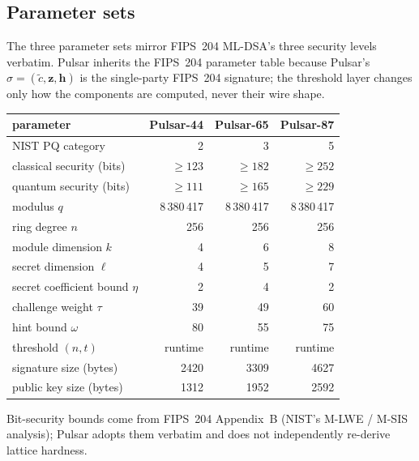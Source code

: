 
\subsection*{Parameter sets}

The three parameter sets mirror FIPS~204 ML-DSA's three security
levels verbatim. Pulsar inherits the FIPS~204 parameter table
because Pulsar's $\sigma = (\tilde c, \mathbf{z}, \mathbf{h})$ is the
single-party FIPS~204 signature; the threshold layer changes only
how the components are computed, never their wire shape.

\begin{center}
\begin{tabular}{l r r r}
\toprule
parameter & Pulsar-44 & Pulsar-65 & Pulsar-87 \\
\midrule
NIST PQ category               & 2          & 3          & 5 \\
classical security (bits)      & $\geq 123$ & $\geq 182$ & $\geq 252$ \\
quantum security (bits)        & $\geq 111$ & $\geq 165$ & $\geq 229$ \\
modulus $q$                    & 8\,380\,417 & 8\,380\,417 & 8\,380\,417 \\
ring degree $n$                & 256        & 256        & 256 \\
module dimension $k$           & 4          & 6          & 8 \\
secret dimension $\ell$        & 4          & 5          & 7 \\
secret coefficient bound $\eta$& 2          & 4          & 2 \\
challenge weight $\tau$        & 39         & 49         & 60 \\
hint bound $\omega$            & 80         & 55         & 75 \\
threshold $(n, t)$             & runtime    & runtime    & runtime \\
\midrule
signature size (bytes)         & 2420       & 3309       & 4627 \\
public key size (bytes)        & 1312       & 1952       & 2592 \\
\bottomrule
\end{tabular}
\end{center}

Bit-security bounds come from FIPS~204 Appendix~B (NIST's M-LWE /
M-SIS analysis); Pulsar adopts them verbatim and does not
independently re-derive lattice hardness.

